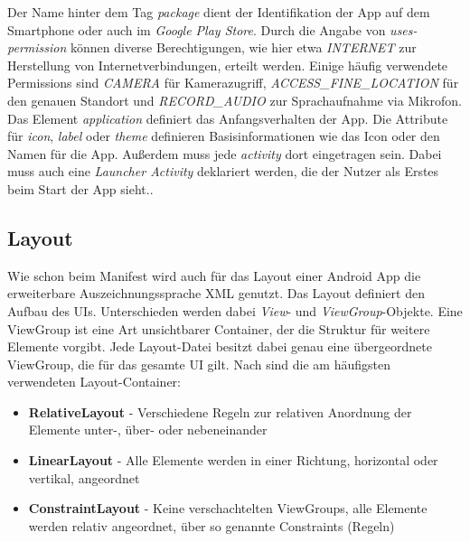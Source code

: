 Der Name hinter dem Tag \textit{package} dient der Identifikation der App auf dem Smartphone oder auch im \textit{Google Play Store}. Durch die Angabe von \textit{uses-permission} können diverse Berechtigungen, wie hier etwa \textit{INTERNET} zur Herstellung von Internetverbindungen, erteilt werden. Einige häufig verwendete Permissions sind \textit{CAMERA} für Kamerazugriff, \textit{ACCESS\_FINE\_LOCATION} für den genauen Standort und \mbox{\textit{RECORD\_AUDIO}} zur Sprachaufnahme via Mikrofon. Das Element \textit{application} definiert das Anfangsverhalten der App. Die Attribute für \textit{icon}, \textit{label} oder \textit{theme} definieren Basisinformationen wie das Icon oder den Namen für die App. Außerdem muss jede \textit{activity} dort eingetragen sein. Dabei muss auch eine \textit{Launcher Activity} deklariert werden, die der Nutzer als Erstes beim Start der App sieht.. \cite[S. 42-43]{allen_beginning_2015}\cite{android_developers_app_2018}

\subsection{Layout}
\label{subsec:basics-android-layout}

Wie schon beim Manifest wird auch für das Layout einer Android App die erweiterbare Auszeichnungssprache \ac{XML} genutzt. Das Layout definiert den Aufbau des \aclp{UI}. Unterschieden werden dabei \textit{View}- und \textit{ViewGroup}-Objekte. Eine ViewGroup ist eine Art unsichtbarer Container, der die Struktur für weitere Elemente vorgibt. Jede Layout-Datei besitzt dabei genau eine übergeordnete ViewGroup, die für das gesamte \ac{UI} gilt. Nach \cite[S. 79-80]{allen_beginning_2015} sind die am häufigsten verwendeten Layout-\mbox{Container}:
\begin{itemize}
\item\textbf{RelativeLayout} - Verschiedene Regeln zur relativen Anordnung der Elemente unter-, über- oder nebeneinander 
\item\textbf{LinearLayout} - Alle Elemente werden in einer Richtung, horizontal oder vertikal, angeordnet
\item\textbf{ConstraintLayout} - Keine verschachtelten ViewGroups, alle Elemente werden relativ angeordnet, über so genannte Constraints (Regeln)
\end{itemize}

